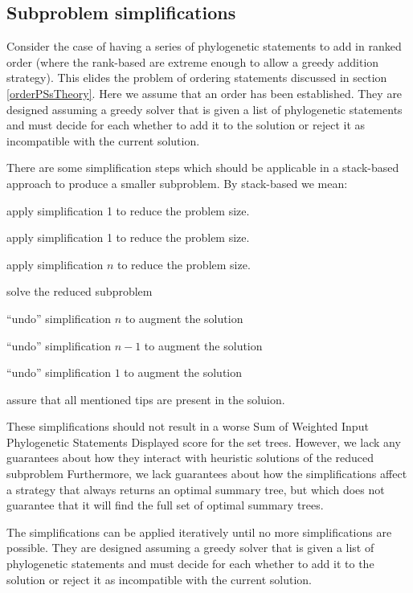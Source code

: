 \documentclass[11pt]{article}
\newcommand{\pss}{phylogenetic statements\xspace}
\newcommand{\PSs}{Phylogenetic Statements\xspace}
\newcommand{\SWIPSD}{Sum of Weighted Input \PSs Displayed\xspace}
\begin{document}
\subsection{Subproblem simplifications}\label{simplificationTheory}
Consider the case of having a series of \pss to add in ranked order (where the
    rank-based are extreme enough to allow a greedy addition strategy).
This elides the problem of ordering statements discussed in section \ref{orderPSsTheory}. 
Here we assume that an order has been established.
They are designed assuming a greedy solver that is given a list of \pss and must decide
    for each whether to add it to the solution or reject it as incompatible with the 
    current solution.

There are some simplification steps which should be applicable in a stack-based
    approach to produce a smaller subproblem.
By stack-based we mean:
\begin{compactenum}
    \item apply simplification 1 to reduce the problem size.
    \item apply simplification 1 to reduce the problem size.
    \item[$\ldots]
    \item[$n$] apply simplification $n$ to reduce the problem size.
    \item[$n + 1$] solve the reduced subproblem
    \item[$n + 2$]``undo'' simplification $n$ to augment the solution
    \item[$n + 3$] ``undo'' simplification $n-1$ to augment the solution
    \item[$\ldots]
    \item[$2n + 1$] ``undo'' simplification $1$ to augment the solution
    \item[$2n +2$] assure that all mentioned tips are present in the soluion.
\end{compactenum}

These simplifications should not result in a worse \SWIPSD score for the set trees.
However, we lack any guarantees about how they interact with heuristic solutions
    of the reduced subproblem 
Furthermore, we lack guarantees about how the simplifications affect a strategy that always
    returns an optimal summary tree, but which does not guarantee that it will
    find the full set of optimal summary trees.

The simplifications can be applied iteratively until no more simplifications are possible.
They are designed assuming a greedy solver that is given a list of \pss and must decide
    for each whether to add it to the solution or reject it as incompatible with the 
    current solution.
\end{document}
